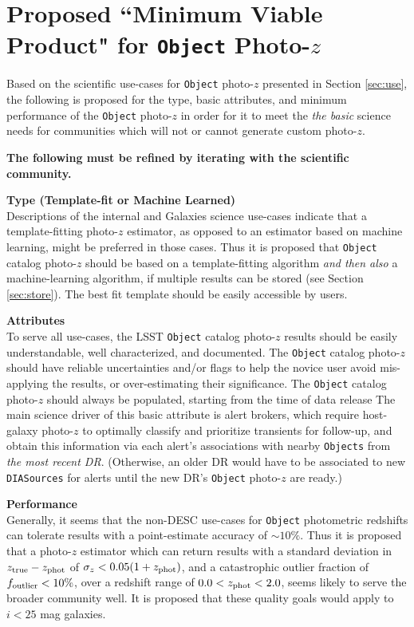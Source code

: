 \documentclass[DM,lsstdraft,toc]{lsstdoc}
\begin{document}
\section{Proposed ``Minimum Viable Product" for {\tt Object} Photo-$z$}\label{sec:nec}

Based on the scientific use-cases for {\tt Object} photo-$z$ presented in Section \ref{sec:use}, the following is proposed for the type, basic attributes, and minimum performance of the {\tt Object} photo-$z$ in order for it to meet the {\it the basic} science needs for communities which will not or cannot generate custom photo-$z$.

{\bf The following must be refined by iterating with the scientific community.}

{\bf Type (Template-fit or Machine Learned)}\\
Descriptions of the internal and Galaxies science use-cases indicate that a template-fitting photo-$z$ estimator, as opposed to an estimator based on machine learning, might be preferred in those cases.
Thus it is proposed that  {\tt Object} catalog photo-$z$ should be based on a template-fitting algorithm {\it and then also} a machine-learning algorithm, if multiple results can be stored (see Section \ref{sec:store}).
The best fit template should be easily accessible by users. 

{\bf Attributes}\\
To serve all use-cases, the LSST {\tt Object} catalog photo-$z$ results should be easily understandable, well characterized, and documented.
The {\tt Object} catalog photo-$z$ should have reliable uncertainties and/or flags to help the novice user avoid mis-applying the results, or over-estimating their significance.
The {\tt Object} catalog photo-$z$ should always be populated, starting from the time of data release
The main science driver of this basic attribute is alert brokers, which require host-galaxy photo-$z$ to optimally classify and prioritize transients for follow-up, and obtain this information via each alert's associations with nearby {\tt Objects} from {\it the most recent DR}.
(Otherwise, an older DR would have to be associated to new {\tt DIASources} for alerts until the new DR's {\tt Object} photo-$z$ are ready.)

{\bf Performance}\\
Generally, it seems that the non-DESC use-cases for {\tt Object} photometric redshifts can tolerate results with a point-estimate accuracy of $\sim10\%$.
Thus it is proposed that a photo-$z$ estimator which can return results with a standard deviation in $z_{\rm true}-z_{\rm phot}$ of $\sigma_z < 0.05(1+z_{\rm phot})$, and a catastrophic outlier fraction of $f_{\rm outlier} < 10\%$, over a redshift range of $0.0 < z_{\rm phot} < 2.0$, seems likely to serve the broader community well.
It is proposed that these quality goals would apply to $i<25$ mag galaxies.
\end{document}
